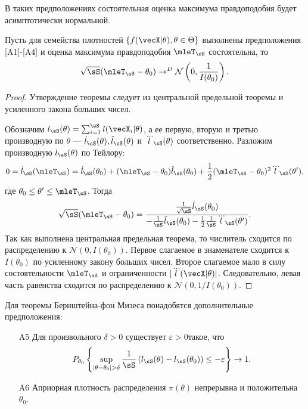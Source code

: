 В таких предположениях состоятельная оценка максимума правдоподобия
будет асимптотически нормальной.

\begin{Theorem}
Пусть для семейства плотностей $\{f(\vecX|\theta), \theta \in \Theta\}$ выполнены предположения [A1]-[A4] и оценка максимума правдоподобия $\mleT_{\sS}$ состоятельна, то
\[
\sqrt{\sS} (\mleT_{\sS} - \theta_0) \rightarrow^D \mathcal{N} \left(0, \frac{1}{I(\theta_0)}\right).
\]
\end{Theorem}

\begin{proof}
Утверждение теоремы следует из центральной предельной теоремы и усиленного закона больших чисел. 

Обозначим $l_\sS(\theta) = \sum_{i = 1}^{\sS} l(\vecX_i | \theta)$,
а ее первую, вторую и третью производную по $\theta$ --- $\dot{l}_\sS(\theta), \ddot{l}_\sS(\theta)$ и $\dddot{l}_\sS(\theta)$ соответственно.
Разложим производную $l_\sS(\theta)$ по Тейлору:
\[
0 = \dot{l}_{\sS}(\mleT_\sS) = \dot{l}_{\sS}(\theta_0) + (\mleT_\sS - \theta_0) \ddot{l}_{\sS}(\theta_0) + \frac12 (\mleT_\sS - \theta_0)^2 \dddot{l}_{\sS}(\theta'),
\]
где $\theta_0 \leq \theta' \leq \mleT_\sS$.
Тогда
\[
\sqrt{\sS} (\mleT_\sS - \theta_0) = \frac{\frac{1}{\sqrt{\sS}} \dot{l}_{\sS}(\theta_0)}{-\frac{1}{\sS} \ddot{l}_{\sS}(\theta_0) - \frac12 \frac{1}{\sS} \dddot{l}_{\sS}(\theta')}. 
\]
Так как выполнена центральная предельная теорема, то числитель сходится по распределению к $\mathcal{N}(0, I(\theta_0))$.
Первое слагаемое в знаменателе сходится к $I(\theta_0)$ по усиленному закону больших чисел.
Второе слагаемое мало в силу состоятельности $\mleT_\sS$ и ограниченности $|\dddot{l}(\vecX | \theta)|$.
Следовательно, левая часть равенства сходится по распределению к 
$\mathcal{N}(0, 1 / I(\theta_0))$.
\end{proof}

Для теоремы Бернштейна-фон Мизеса понадобятся дополнительные предположения:
\begin{itemize}
	\item[A5] Для произвольного $\delta > 0$ существует $\varepsilon > 0$такое, что
	\[
	P_{\theta_0} \left\{ \sup_{|\theta - \theta_0| > \delta} \frac{1}{\sS} \left( l_\sS(\theta) - l_\sS(\theta_0) \right) \leq -\varepsilon \right\} \rightarrow 1.
	\]
	\item[A6] Априорная плотность распределения $\pi(\theta)$ непрерывна и положительна $\theta_0$.
\end{itemize}

